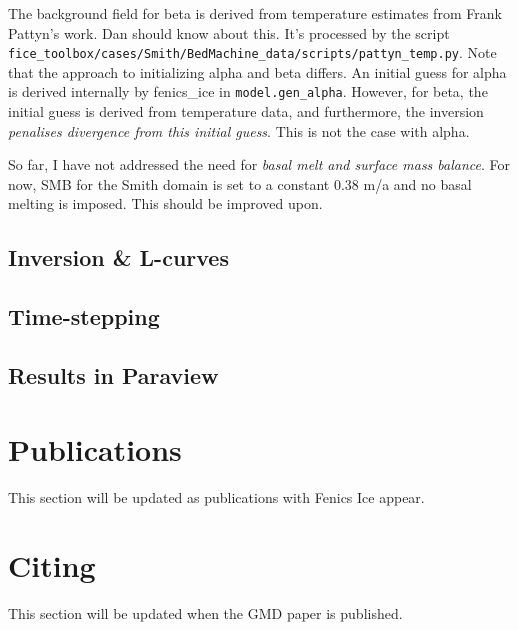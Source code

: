 \documentclass[11pt, reqno, nocenter]{article}
\begin{document}
The background field for beta is derived from temperature estimates from Frank Pattyn's work. Dan should know about this. It's processed by the script\\
 {\tt fice\_toolbox/cases/Smith/BedMachine\_data/scripts/pattyn\_temp.py}. Note that the approach to initializing alpha and beta differs. An initial guess for alpha is derived internally by fenics\_ice in {\tt model.gen\_alpha}. However, for beta, the initial guess is derived from temperature data, and furthermore, the inversion \emph{penalises divergence from this initial guess}. This is not the case with alpha.

So far, I have not addressed the need for \emph{basal melt and surface mass balance}. For now, SMB for the Smith domain is set to a constant 0.38 m/a and no basal melting is imposed. This should be improved upon.

\subsection{Inversion \& L-curves}



\subsection{Time-stepping}

\subsection{Results in Paraview}

\section{Publications}
This section will be updated as publications with Fenics Ice appear.

\section{Citing}
This section will be updated when the GMD paper is published.



\newpage


\end{document}
